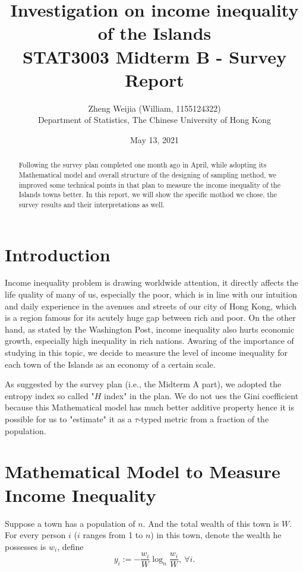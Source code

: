 \documentclass[12pt]{article}%
\begin{document}
\large

\title{
Investigation on income inequality of the Islands\\
\Large STAT3003 Midterm B - Survey Report}
\author{Zheng Weijia (William, 1155124322) \\
Department of Statistics,
The Chinese University of Hong Kong}
\date{May 13, 2021}
\maketitle

\begin{abstract}
    Following the survey plan completed one month ago in April, 
    while adopting its Mathematical model and 
    overall structure of the designing of sampling method, 
    we improved some technical points in that plan 
    to measure the income inequality of the Islands towns better. 
    In this report, we will show the specific mothod we chose, 
    the survey results and their interpretations as well.

\end{abstract}

\section{Introduction}
Income inequality problem is drawing worldwide attention, 
it directly affects the life quality of many of us, especially the poor, 
which is in line with our intuition and daily experience 
in the avenues and streets of our city of Hong Kong, 
which is a region famous for its acutely huge gap between rich and poor.
On the other hand, as stated by the Washington Post, income inequality also
hurts economic growth, especially high inequality in rich nations. 
Awaring of the importance of studying in this topic,
we decide to measure the level of income inequality 
for each town of the Islands as an economy of a certain scale. 

As suggested by the survey plan (i.e., the Midterm A part), 
we adopted the entropy index so called "$H$ index" in the plan. 
We do not ues the Gini coefficient because 
this Mathematical model has much better additive property hence 
it is possible for us to "estimate" it 
as a $\tau$-typed metric from a fraction of the population.


\section{Mathematical Model to Measure Income Inequality}
Suppose a town has a population of $n$. 
And the total wealth of this town is $W$. 
For every person $i$ ($i$ ranges from 1 to $n$) in this town, 
denote the wealth he possesses is $w_i$, define 
$$y_i := -\frac{w_i}{W}\log_{n}{ \frac{w_i}{W} } ,~ \forall i.$$
\end{document}
